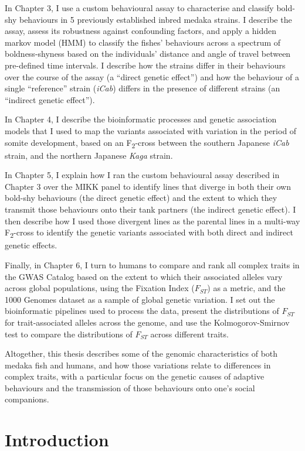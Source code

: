 \documentclass[
]{book}
\begin{document}
In Chapter 3, I use a custom behavioural assay to characterise and classify bold-shy behaviours in 5 previously established inbred medaka strains. I describe the assay, assess its robustness against confounding factors, and apply a hidden markov model (HMM) to classify the fishes' behaviours across a spectrum of boldness-shyness based on the individuals' distance and angle of travel between pre-defined time intervals. I describe how the strains differ in their behaviours over the course of the assay (a ``direct genetic effect'') and how the behaviour of a single ``reference'' strain (\emph{iCab}) differs in the presence of different strains (an ``indirect genetic effect'').

In Chapter 4, I describe the bioinformatic processes and genetic association models that I used to map the variants associated with variation in the period of somite development, based on an F\textsubscript{2}-cross between the southern Japanese \emph{iCab} strain, and the northern Japanese \emph{Kaga} strain.

In Chapter 5, I explain how I ran the custom behavioural assay described in Chapter 3 over the MIKK panel to identify lines that diverge in both their own bold-shy behaviours (the direct genetic effect) and the extent to which they transmit those behaviours onto their tank partners (the indirect genetic effect). I then describe how I used those divergent lines as the parental lines in a multi-way F\textsubscript{2}-cross to identify the genetic variants associated with both direct and indirect genetic effects.

Finally, in Chapter 6, I turn to humans to compare and rank all complex traits in the GWAS Catalog based on the extent to which their associated alleles vary across global populations, using the Fixation Index (\(F_{ST}\)) as a metric, and the 1000 Genomes dataset as a sample of global genetic variation. I set out the bioinformatic pipelines used to process the data, present the distributions of \(F_{ST}\) for trait-associated alleles across the genome, and use the Kolmogorov-Smirnov test to compare the distributions of \(F_{ST}\) across different traits.

Altogether, this thesis describes some of the genomic characteristics of both medaka fish and humans, and how those variations relate to differences in complex traits, with a particular focus on the genetic causes of adaptive behaviours and the transmission of those behaviours onto one's social companions.

\hypertarget{Introduction}{%
\chapter{Introduction}\label{Introduction}}
\end{document}
